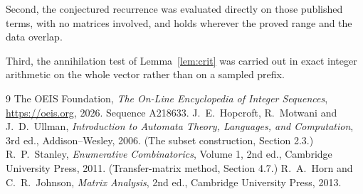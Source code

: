 \documentclass[11pt,a4paper]{article}
\theoremstyle{plain}
\theoremstyle{definition}
\begin{document}
Second, the conjectured recurrence was evaluated directly on those published terms, with no
matrices involved, and holds wherever the proved range and the data overlap.

Third, the annihilation test of Lemma~\ref{lem:crit} was carried out in exact integer
arithmetic on the whole vector rather than on a sampled prefix.

\begin{thebibliography}{9}
 The OEIS Foundation, \emph{The On-Line Encyclopedia of Integer
Sequences}, \url{https://oeis.org}, 2026. Sequence A218633.
 J.~E.~Hopcroft, R.~Motwani and J.~D.~Ullman, \emph{Introduction to Automata
Theory, Languages, and Computation}, 3rd ed., Addison--Wesley, 2006. (The subset
construction, Section 2.3.)
 R.~P.~Stanley, \emph{Enumerative Combinatorics}, Volume 1, 2nd ed.,
Cambridge University Press, 2011. (Transfer-matrix method, Section 4.7.)
 R.~A.~Horn and C.~R.~Johnson, \emph{Matrix Analysis}, 2nd ed., Cambridge
University Press, 2013.
\end{thebibliography}
\end{document}
